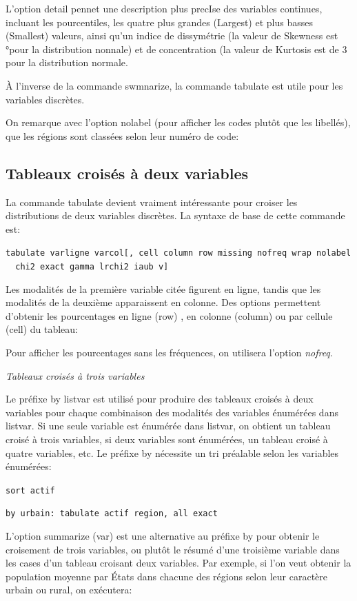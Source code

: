 \documentclass[
]{book}
\begin{document}
L'option detail pennet une description plus precIse des
variables continues, incluant les pourcentiles, les quatre plus
grandes (Largest) et plus basses (Smallest) valeurs, ainsi
qu'un indice de dissymétrie (la valeur de Skewness est °pour
la distribution nonnale) et de concentration (la valeur de
Kurtosis est de 3 pour la distribution normale.

À l'inverse de la commande swmnarize, la commande tabulate est utile pour les variables discrètes.

On remarque avec l'option nolabel (pour afficher les codes plutôt que les libellés), que les régions sont classées selon leur numéro de code:

\hypertarget{tableaux-croisuxe9s-uxe0-deux-variables}{%
\subsection{Tableaux croisés à deux variables}\label{tableaux-croisuxe9s-uxe0-deux-variables}}

La commande tabulate devient vraiment intéressante pour croiser les distributions de deux variables discrètes. La syntaxe de base de cette commande est:

\texttt{tabulate\ varligne\ varcol{[},\ cell\ column\ row\ missing\ nofreq\ wrap\ nolabel\ \ chi2\ exact\ gamma\ lrchi2\ iaub\ v{]}}

Les modalités de la première variable citée figurent en ligne, tandis que les modalités de la deuxième apparaissent en colonne. Des options permettent d'obtenir les pourcentages en ligne (row) , en colonne (column) ou par cellule (cell) du tableau:

Pour afficher les pourcentages sans les fréquences, on utilisera l'option \emph{nofreq}.

\emph{Tableaux croisés à trois variables}

Le préfixe by listvar est utilisé pour produire des tableaux
croisés à deux variables pour chaque combinaison des modalités
des variables énumérées dans listvar. Si une seule variable
est énumérée dans listvar, on obtient un tableau croisé à trois
variables, si deux variables sont énumérées, un tableau croisé à
quatre variables, etc. Le préfixe by nécessite un tri préalable
selon les variables énumérées:

\texttt{sort\ actif}

\texttt{by\ urbain:\ tabulate\ actif\ region,\ all\ exact}

L'option summarize (var) est une alternative au préfixe by
pour obtenir le croisement de trois variables, ou plutôt le résumé
d'une troisième variable dans les cases d'un tableau croisant
deux variables. Par exemple, si l'on veut obtenir la population
moyenne par États dans chacune des régions selon leur caractère
urbain ou rural, on exécutera:
\end{document}
